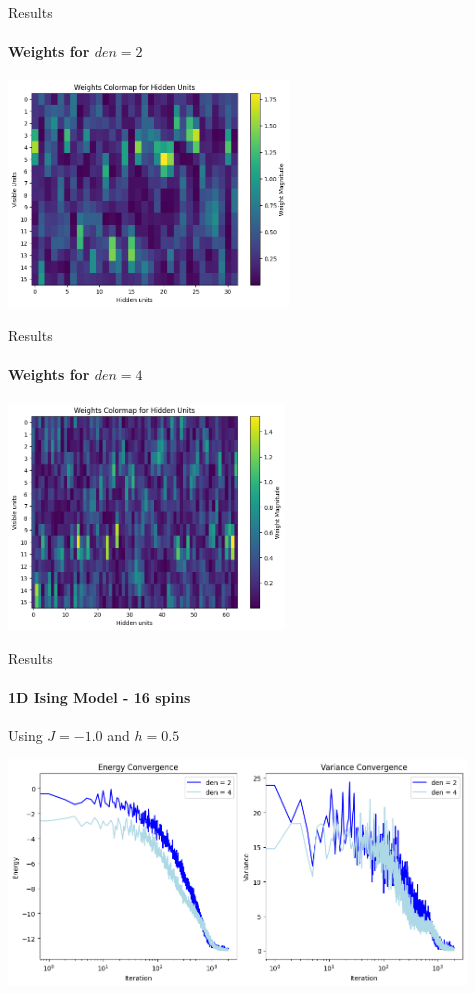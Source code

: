 \documentclass{beamer}
\begin{document}
\begin{frame}{Results}
\framesubtitle{Weights for $den = 2$}
\begin{center}
\includegraphics[height=6cm]{images/16spin_den2_j1.png}
\end{center}
\end{frame}

\begin{frame}{Results}
\framesubtitle{Weights for $den = 4$}
\begin{center}
\includegraphics[height=6cm]{images/16spin_den4_j1.png}
\end{center}
\end{frame}

\begin{frame}{Results}
\framesubtitle{1D Ising Model - 16 spins}
Using $J = -1.0$ and $h=0.5$
\begin{center}
\includegraphics[height=6cm]{images/16spin_history_jm1.png}
\end{center}
\end{frame}
\end{document}
